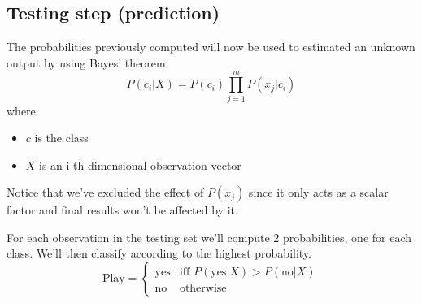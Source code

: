 \subsection{Testing step (prediction)}
The probabilities previously computed will now be used to estimated an unknown output by using Bayes' theorem.
\begin{equation}
P(c_i|X) = P(c_i) \prod_{j=1}^{m}P(x_j|c_i)
\end{equation}
where
\begin{itemize}
	\item $c$ is the class
	\item $X$ is an i-th dimensional observation vector
\end{itemize}

Notice that we've excluded the effect of $P(x_j)$ since it only acts as a scalar factor and final results won't be affected by it.

For each observation in the testing set we'll compute 2 probabilities, one for each class. We'll then classify according to the highest probability.
\begin{equation}
\text{Play} = \begin{cases}
\text{yes} & \text{iff } P(\text{yes}|X) > P(\text{no}|X) \\
\text{no} & \text{otherwise}
\end{cases}
\end{equation}